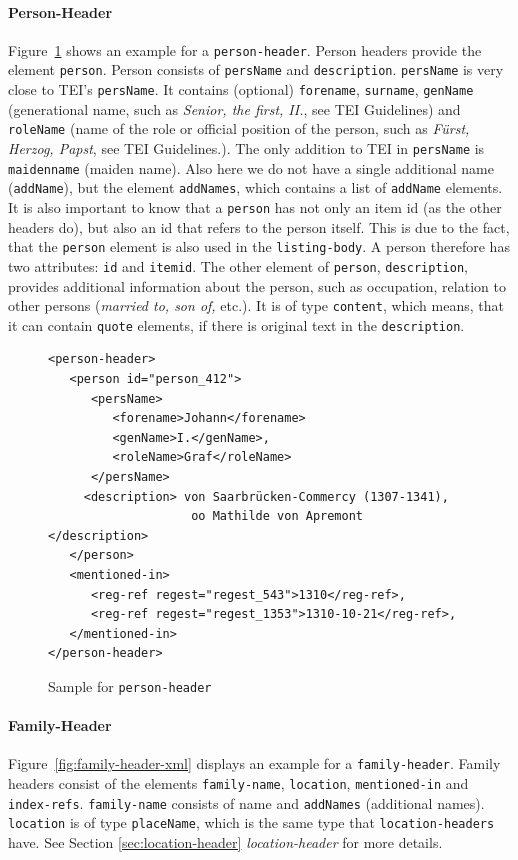 \paragraph{Person-Header}
\label{sec:person-header}
Figure~\ref{fig:person-header-xml} shows an example for a
\texttt{person-header}. Person headers provide the element
\texttt{person}. Person consists of \texttt{persName} and
\texttt{description}. \texttt{persName} is very close to TEI's
\texttt{persName}. It contains (optional) \texttt{forename},
\texttt{surname}, \texttt{genName} (generational name, such as
\textit{Senior, the first, II.}, see TEI Guidelines) and
\texttt{roleName} (name of the role or official position of the
person, such as \textit{Fürst, Herzog, Papst}, see TEI Guidelines.).
The only addition to TEI in \texttt{persName} is \texttt{maidenname}
(maiden name). Also here we do not have a single additional name
(\texttt{addName}), but the element \texttt{addNames}, which contains
a list of \texttt{addName} elements. It is also important to know that
a \texttt{person} has not only an item id (as the other headers do),
but also an id that refers to the person itself. This is due to the
fact, that the \texttt{person} element is also used in the
\texttt{listing-body}. A person therefore has two attributes:
\texttt{id} and \texttt{itemid}. The other element of \texttt{person},
\texttt{description}, provides additional information about the
person, such as occupation, relation to other persons (\textit{married
  to, son of,} etc.). It is of type \texttt{content}, which means,
that it can contain \texttt{quote} elements, if there is original text
in the \texttt{description}.

\begin{figure}[H]
\centering
\begin{verbatim}
<person-header>
   <person id="person_412">
      <persName>
         <forename>Johann</forename>
         <genName>I.</genName>,
         <roleName>Graf</roleName>
      </persName>
     <description> von Saarbrücken-Commercy (1307-1341),
                    oo Mathilde von Apremont    </description>
   </person>
   <mentioned-in>
      <reg-ref regest="regest_543">1310</reg-ref>,
      <reg-ref regest="regest_1353">1310-10-21</reg-ref>,
   </mentioned-in>
</person-header>
\end{verbatim}
\caption{Sample for \texttt{person-header}}
\label{fig:person-header-xml}
\end{figure}

\paragraph{Family-Header}
Figure~\ref{fig:family-header-xml} displays an example for a
\texttt{family-header}. Family headers consist of the elements
\texttt{family-name}, \texttt{location}, \texttt{mentioned-in} and
\texttt{index-refs}. \texttt{family-name} consists of name and
\texttt{addNames} (additional names). \texttt{location} is of type
\texttt{placeName}, which is the same type that
\texttt{location-headers} have. See Section \ref{sec:location-header}
\textit{location-header} for more details.

